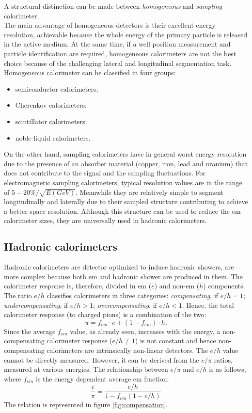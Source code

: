 A structural distinction can be made between \textit{homogeneous} and \textit{sampling} calorimeter.\\
The main advantage of homogeneous detectors is their excellent energy resolution, achievable because the whole energy of the primary particle is released in the active medium. At the same time, if a well position measurement and particle identification are required, homogeneous calorimeters are not the best choice because of the challenging lateral and longitudinal segmentation task. 
Homogeneous calorimeter can be classified in four groups:
\begin{itemize}
    \item semiconductor calorimeters;
    \item Cherenkov calorimeters;
    \item scintillator calorimeters;
    \item noble-liquid calorimeters.
\end{itemize}

On the other hand, sampling calorimeters have in general worst energy resolution due to the presence of an absorber material (copper, iron, lead and uranium) that does not contribute to the signal and the sampling fluctuations. For electromagnetic sampling calorimeters, typical resolution values are in the range of $5-20 \% / \sqrt{E(GeV)}$. Meanwhile they are relatively simple to segment longitudinally and laterally due to their sampled structure contributing to achieve a better space resolution. Although this structure can be used to reduce the em calorimeter sizes, they are universally used in hadronic calorimeters.

\subsection*{Hadronic calorimeters}
Hadronic calorimeters are detector optimized to induce hadronic showers, are more complex because both em and hadronic shower are produced in them. The calorimeter response is, therefore, divided in em ($e$) and non-em ($h$) components. The ratio $e/h$ classifies calorimeters in three categories: \textit{compensating}, if $e/h=1$; \textit{undercompensating}, if $e/h>1$; \textit{overcompensating}, if $e/h<1$. Hence, the total calorimeter response (to charged pions) is a combination of the two:
\begin{equation}
    \pi = f_{em} \cdot e + (1- f_{em}) \cdot h.
\end{equation}
Since the average $f_{em}$ value, as already seen, increases with the energy, a non-compensating calorimeter response ($e/h \neq  1$) is not constant and hence non-compensating calorimeters are intrinsically non-linear detectors.
The $e/h$ value cannot be directly measured. However, it can be derived from the $e/\pi$ ratios, measured at various energies. The relationship between $e/\pi$ and $e/h$ is as follows, where $f_{em}$ is the energy dependent average em fraction:
\begin{equation}
    \frac{e}{\pi} = \frac{e/h}{1 - f_{em}(1-e/h)}
\end{equation}
The relation is represented in figure \ref{fig:compensation}.

